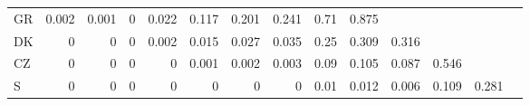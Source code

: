 \begin{table}[H]
\begin{tabular}{lrrrrrrrrrrrrr}
    GR    & 0.002 & 0.001 & 0     & 0.022 & 0.117 & 0.201 & 0.241 & 0.71  & 0.875 &       &       &       &  \\
    DK    & 0     & 0     & 0     & 0.002 & 0.015 & 0.027 & 0.035 & 0.25  & 0.309 & 0.316 &       &       &  \\
    CZ    & 0     & 0     & 0     & 0     & 0.001 & 0.002 & 0.003 & 0.09  & 0.105 & 0.087 & 0.546 &       &  \\
    S     & 0     & 0     & 0     & 0     & 0     & 0     & 0     & 0.01  & 0.012 & 0.006 & 0.109 & 0.281 &  \\
    \end{tabular}%
  \label{tab:addlabel}%
\end{table}%
